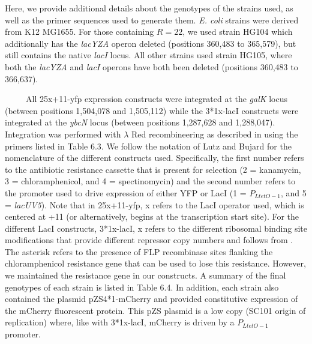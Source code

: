 \documentclass[12pt]{caltech_thesis}
\begin{document}
Here, we provide additional details about the genotypes of the strains
used, as well as the primer sequences used to generate them. \emph{E.
coli} strains were derived from K12 MG1655. For those containing
\(R=22\), we used strain HG104 which additionally has the \emph{lacYZA}
operon deleted (positions 360,483 to 365,579), but still contains the
native \emph{lacI} locus. All other strains used strain HG105, where
both the \emph{lacYZA} and \emph{lacI} operons have both been deleted
(positions 360,483 to 366,637).

~~~~~All 25x+11-yfp expression constructs were integrated at the
\emph{galK} locus (between positions 1,504,078 and 1,505,112) while the
3*1x-lacI constructs were integrated at the \emph{ybcN} locus (between
positions 1,287,628 and 1,288,047). Integration was performed with
\(\lambda\) Red recombineering \autocite{sharan2009} as described in
\textcite{garcia2011} using the primers listed in Table 6.3. We follow
the notation of Lutz and Bujard \autocite{lutz1997} for the nomenclature
of the different constructs used. Specifically, the first number refers
to the antibiotic resistance cassette that is present for selection (2 =
kanamycin, 3 = chloramphenicol, and 4 = spectinomycin) and the second
number refers to the promoter used to drive expression of either YFP or
LacI (1 = \(P_{LtetO-1}\), and 5 = \emph{lacUV5}). Note that in
25x+11-yfp, x refers to the LacI operator used, which is centered at +11
(or alternatively, begins at the transcription start site). For the
different LacI constructs, 3*1x-lacI, x refers to the different
ribosomal binding site modifications that provide different repressor
copy numbers and follows from \textcite{garcia2011}. The asterisk refers
to the presence of FLP recombinase sites flanking the chloramphenicol
resistance gene that can be used to lose this resistance. However, we
maintained the resistance gene in our constructs. A summary of the final
genotypes of each strain is listed in Table 6.4. In addition, each
strain also contained the plasmid pZS4*1-mCherry and provided
constitutive expression of the mCherry fluorescent protein. This pZS
plasmid is a low copy (SC101 origin of replication) where, like with
3*1x-lacI, mCherry is driven by a \(P_{LtetO-1}\) promoter.
\end{document}

